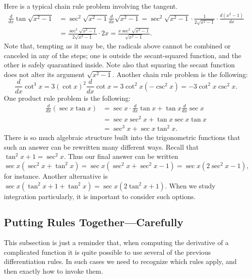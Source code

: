 \bex Here is a typical chain rule problem involving the tangent.
\begin{align*}
\frac{d}{dx}\tan \sqrt{x^2-1}
&=\sec^2\sqrt{x^2-1}\frac{d}{dx}\sqrt{x^2-1}
=\sec^2\sqrt{x^2-1}\cdot\frac1{2\sqrt{x^2-1}}\cdot\frac{d(x^2-1)}{dx}\\
&=\frac{\sec^2\sqrt{x^2-1}}{2\sqrt{x^2-1}}\cdot2x
=\frac{x\sec^2\sqrt{x^2-1}}{\sqrt{x^2-1}}.\end{align*}
\eex
Note that, tempting as it may be,
the radicals above cannot be combined or canceled in
any of the steps; one is outside the secant-squared function,
and the other is safely quarantined inside.  Note also that
squaring the secant function does not alter its argument
$\sqrt{x^2-1}$.
\bex Another chain rule problem is the following:
$$\frac{d}{dx}\cot^3x=3(\cot x)^2\frac{d}{dx}\cot x
=3\cot^2x(-\csc^2x)=-3\cot^2x\csc^2x.$$
\eex
\bex One product rule problem is the following:
\begin{align*}
\frac{d}{dx}(\sec x\tan x)
&=\sec x\cdot\frac{d}{dx}\tan x+\tan x\frac{d}{dx}\sec x\\
&=\sec x\sec^2x+\tan x\sec x\tan x\\
&=\sec^3x+\sec x\tan^2x.\end{align*}
There is so much algebraic structure built into the trigonometric
functions that such an answer can be rewritten many different
ways.  Recall that $\tan^2x+1=\sec^2x$.  Thus our final answer
can be written
$$\sec x(\sec^2x+\tan^2x)=\sec x(\sec^2x+\sec^2x-1)=\sec x(2\sec^2x-1),$$
for instance. Another alternative is $\sec x(\tan^2x+1+\tan^2x)
=\sec x(2\tan^2x+1)$.  When we study integration particularly, it is important
to consider such options.  \eex






\subsection{Putting Rules Together---Carefully}


This subsection is just a reminder that, when 
computing the derivative of a complicated function
it is quite
possible to use several of the previous differentiation rules.
In such cases we need to recognize which rules apply, and
then exactly how to invoke them. 

